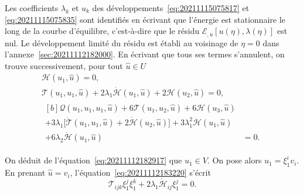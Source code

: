 \documentclass[12pt, final]{amsart}
\begin{document}
Les coefficients \(\lambda_k\) et \(u_k\) des
développements~\eqref{eq:20211115075817} et \eqref{eq:20211115075835} sont
identifiés en écrivant que l'énergie est stationnaire le long de la courbe
d'équilibre, c'est-à-dire que le résidu
\(\mathcal E_{,u}[u(\eta), \lambda(\eta)]\) est nul. Le développement limité du
résidu est établi au voisinage de \(\eta=0\) dans
l'annexe~\ref{sec:20211112182000}. En écrivant que tous ses termes s'annulent,
on trouve successivement, pour tout \(\hat{u}\in U\)
\begin{gather}
  \label{eq:20211112182917}
  \mathcal H(u_1, \hat{u})=0,\\
  \label{eq:20211112183220}
  \mathcal T(u_1, u_1, \hat{u})
  +2\lambda_1\dot{\mathcal H}(u_1, \hat{u})
  +2\mathcal H(u_2, \hat{u})=0,\\
  \begin{aligned}[b]
    \mathcal Q(u_1, u_1, u_1, \hat{u})
    +6\mathcal T(u_1, u_2, \hat{u})+6\mathcal H(u_3, \hat{u})&\\
    +3\lambda_1\bigl[\dot{\mathcal T}(u_1, u_1, \hat{u})
    +2\dot{\mathcal H}(u_2, \hat{u})\bigr]
    +3\lambda_1^2\ddot{\mathcal H}(u_1, \hat{u})&\\
    +6\lambda_2\dot{\mathcal H}(u_1, \hat{u})&=0.
  \end{aligned}
\end{gather}

On déduit de l'équation~\eqref{eq:20211112182917} que \(u_1\in V\). On pose
alors \(u_1=ξ_1^i v_i\). En prenant \(\hat{u}=v_i\),
l'équation~\eqref{eq:20211112183220} s'écrit
\begin{equation}
  \mathcal T_{ijk}ξ_1^jξ_1^k+2\lambda_1\dot{\mathcal H}_{ij}ξ_1^j=0.
\end{equation}
\end{document}
